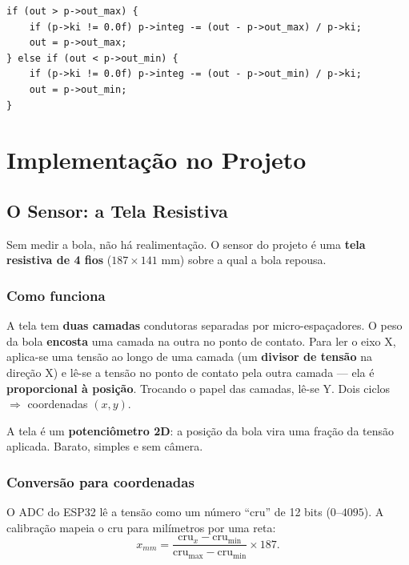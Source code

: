 \begin{lstlisting}[caption={Anti-windup por \emph{back-calculation} em \texttt{main/pid.c}.},label={lst:aw}]
if (out > p->out_max) {
    if (p->ki != 0.0f) p->integ -= (out - p->out_max) / p->ki;
    out = p->out_max;
} else if (out < p->out_min) {
    if (p->ki != 0.0f) p->integ -= (out - p->out_min) / p->ki;
    out = p->out_min;
}
\end{lstlisting}

\part{Implementa\c{c}\~ao no Projeto}

\chapter{O Sensor: a Tela Resistiva}\label{cap:sensor}

Sem medir a bola, n\~ao h\'a realimenta\c{c}\~ao. O sensor do projeto \'e uma
\textbf{tela resistiva de 4 fios} ($187\times141$ mm) sobre a qual a bola repousa.

\section{Como funciona}
A tela tem \textbf{duas camadas} condutoras separadas por micro-espa\c{c}adores. O
peso da bola \textbf{encosta} uma camada na outra no ponto de contato. Para ler o
eixo X, aplica-se uma tens\~ao ao longo de uma camada (um \textbf{divisor de
tens\~ao} na dire\c{c}\~ao X) e l\^e-se a tens\~ao no ponto de contato pela outra
camada --- ela \'e \textbf{proporcional \`a posi\c{c}\~ao}. Trocando o papel das
camadas, l\^e-se Y. Dois ciclos $\Rightarrow$ coordenadas $(x,y)$.

\begin{intuicao}
A tela \'e um \textbf{potenci\^ometro 2D}: a posi\c{c}\~ao da bola vira uma
fra\c{c}\~ao da tens\~ao aplicada. Barato, simples e sem c\^amera.
\end{intuicao}

\section{Convers\~ao para coordenadas}
O ADC do ESP32 l\^e a tens\~ao como um n\'umero ``cru'' de 12 bits ($0$--$4095$). A
calibra\c{c}\~ao mapeia o cru para mil\'imetros por uma reta:
\[
x_{mm} = \frac{\text{cru}_x - \text{cru}_{\min}}{\text{cru}_{\max}-\text{cru}_{\min}}\times 187.
\]

